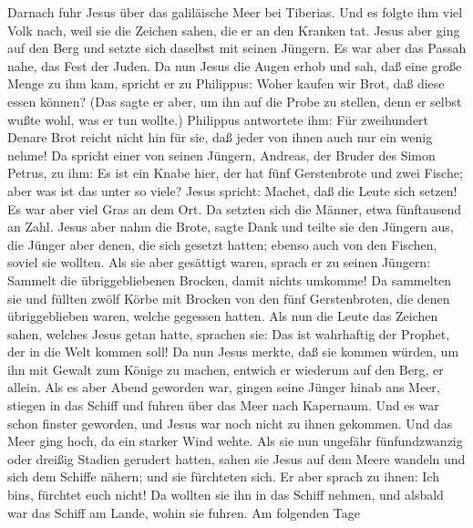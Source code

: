  Darnach fuhr Jesus über das galiläische Meer bei
Tiberias.  Und es folgte ihm viel Volk nach, weil sie die
Zeichen sahen, die er an den Kranken tat.  Jesus aber ging
auf den Berg und setzte sich daselbst mit seinen Jüngern. 
Es war aber das Passah nahe, das Fest der Juden.  Da nun
Jesus die Augen erhob und sah, daß eine große Menge zu ihm kam, spricht
er zu Philippus: Woher kaufen wir Brot, daß diese essen können?
 (Das sagte er aber, um ihn auf die Probe zu stellen, denn
er selbst wußte wohl, was er tun wollte.)  Philippus
antwortete ihm: Für zweihundert Denare Brot reicht nicht hin für sie,
daß jeder von ihnen auch nur ein wenig nehme!  Da spricht
einer von seinen Jüngern, Andreas, der Bruder des Simon Petrus, zu ihm:
 Es ist ein Knabe hier, der hat fünf Gerstenbrote und zwei
Fische; aber was ist das unter so viele?  Jesus spricht:
Machet, daß die Leute sich setzen! Es war aber viel Gras an dem Ort. Da
setzten sich die Männer, etwa fünftausend an Zahl.  Jesus
aber nahm die Brote, sagte Dank und teilte sie den Jüngern aus, die
Jünger aber denen, die sich gesetzt hatten; ebenso auch von den Fischen,
soviel sie wollten.  Als sie aber gesättigt waren, sprach
er zu seinen Jüngern: Sammelt die übriggebliebenen Brocken, damit nichts
umkomme!  Da sammelten sie und füllten zwölf Körbe mit
Brocken von den fünf Gerstenbroten, die denen übriggeblieben waren,
welche gegessen hatten.  Als nun die Leute das Zeichen
sahen, welches Jesus getan hatte, sprachen sie: Das ist wahrhaftig der
Prophet, der in die Welt kommen soll!  Da nun Jesus
merkte, daß sie kommen würden, um ihn mit Gewalt zum Könige zu machen,
entwich er wiederum auf den Berg, er allein.  Als es aber
Abend geworden war, gingen seine Jünger hinab ans Meer, 
stiegen in das Schiff und fuhren über das Meer nach Kapernaum. Und es
war schon finster geworden, und Jesus war noch nicht zu ihnen gekommen.
 Und das Meer ging hoch, da ein starker Wind wehte.
 Als sie nun ungefähr fünfundzwanzig oder dreißig Stadien
gerudert hatten, sahen sie Jesus auf dem Meere wandeln und sich dem
Schiffe nähern; und sie fürchteten sich.  Er aber sprach
zu ihnen: Ich bin\textquotesingle s, fürchtet euch nicht!
 Da wollten sie ihn in das Schiff nehmen, und alsbald war
das Schiff am Lande, wohin sie fuhren.  Am folgenden Tage
